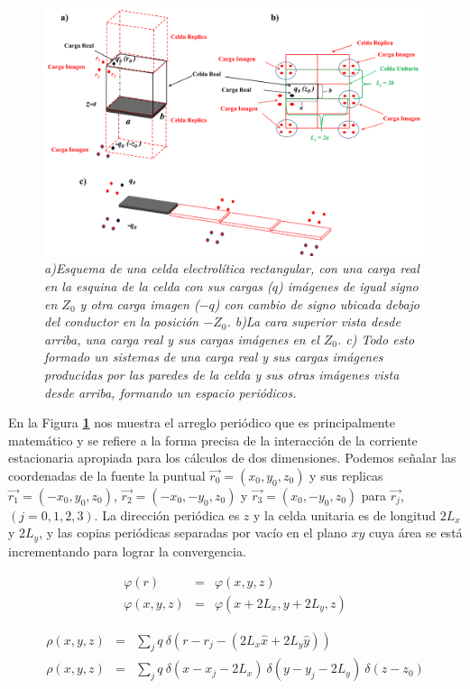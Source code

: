 \documentclass[a4paper,11pt,]{book}
\begin{document}
\begin{figure}[H]
	\centering
	\includegraphics[scale=.4]{../Images/Cellgrin}
	\caption{\emph{a)Esquema de una celda electrolítica rectangular, con una carga real en la esquina de la celda con sus cargas ($q$) imágenes de  igual signo en $Z_0$ y otra carga imagen ($-q$) con cambio de signo  ubicada debajo del  conductor en la posición $-Z_0$. b)La cara superior vista desde arriba, una carga real y sus cargas imágenes  en el $Z_0$. c) Todo esto formado un  sistemas de una carga real y sus  cargas imágenes producidas por las paredes de la celda y sus otras imágenes  vista desde arriba, formando un espacio periódicos. }}
	\label{fig:TA}
\end{figure}
En la Figura \textbf{\ref{fig:TA}}  nos muestra el arreglo periódico que  es principalmente matemático y se refiere a la forma precisa de la interacción de la corriente estacionaria apropiada para los cálculos de dos dimensiones. Podemos señalar las coordenadas de la fuente la puntual $\vec{r_0}= (x_0, y_0, z_0)$ y sus replicas $\vec{r_1}= (-x_0, y_0, z_0)$, $\vec{r_2}= (-x_0, -y_0, z_0)$ y $\vec{r_3}= (x_0, -y_0, z_0)$ para $\vec{r_j}$, $(j=0,1,2,3)$. La dirección periódica es $z$ y la celda unitaria es de longitud $2L_x$ y $2L_y$, y las copias periódicas separadas por vacío en el plano $xy$ cuya área se está incrementando para lograr la convergencia. 

\begin{eqnarray}
\nonumber \varphi(r) &=& \varphi(x,y,z)\\
\varphi(x,y,z)&=& \varphi(x+2L_x,y+2L_y,z)
\end{eqnarray}


\begin{eqnarray}
\nonumber \rho(x,y,z) &=&  \displaystyle\sum_{j} q  \ \delta (r-r_j-(2L_x \hat{x} +2L_y \hat{y})) \\
\rho(x,y,z) &=& \displaystyle\sum_{j} q  \ \delta (x-x_j-2L_x) \ \delta(y-y_j-2L_y) \ \delta (z-z_0)
\end{eqnarray}
\end{document}
